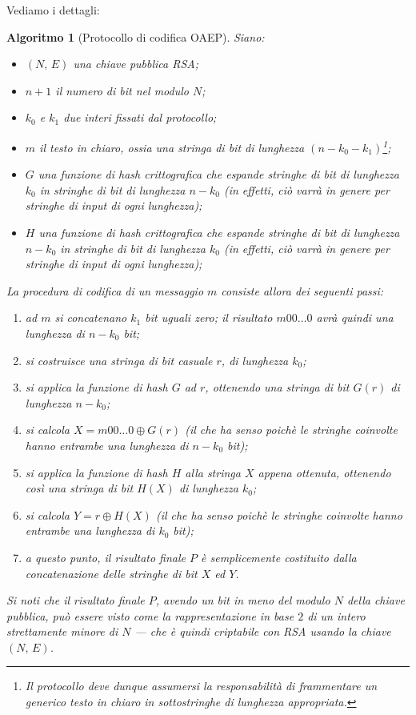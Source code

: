 \documentclass[pdflatex,11pt,a4paper,oneside]{article}
\let\OldEmph\emph
\renewcommand{\emph}[1]{\OldEmph{#1\/}}
\newcommand{\p}[1]{\left({#1}\right)}
\newtheorem{algorithm}[TheoremLike]{Algoritmo}
\begin{document}
\medskip\noindent
Vediamo i dettagli:
\begin{algorithm}[Protocollo di codifica OAEP]
%
Siano:
\begin{itemize}
 \item $(N,\,E)$ una chiave pubblica RSA;
 \item $n + 1$ il numero di bit nel modulo $N$;
 \item $k_0$ e $k_1$ due interi fissati dal protocollo;
 \item $m$ il testo in chiaro, ossia una stringa di bit di lunghezza
       $\p{n - k_0 - k_1}$\footnote{Il protocollo deve dunque assumersi
       la responsabilit\`a di frammentare un generico testo in chiaro in
       sottostringhe di lunghezza appropriata.};
 \item $G$ una funzione di hash crittografica che espande stringhe di bit
       di lunghezza $k_0$ in stringhe di bit di lunghezza $n - k_0$ (in
       effetti, ci\`o varr\`a in genere per stringhe di input di ogni
       lunghezza);
 \item $H$ una funzione di hash crittografica che espande stringhe di bit
       di lunghezza $n - k_0$ in stringhe di bit di lunghezza $k_0$ (in
       effetti, ci\`o varr\`a in genere per stringhe di input di ogni
       lunghezza);
\end{itemize}
%
La procedura di codifica di un messaggio $m$ consiste allora dei seguenti
passi:
\begin{enumerate}
\item
  ad $m$ si concatenano $k_1$ bit uguali zero; il risultato $m00\ldots0$
  avr\`a quindi una lunghezza di $n - k_0$ bit;
\item
  si costruisce una stringa di bit \emph{casuale} $r$, di lunghezza
  $k_0$;
\item
  si applica la funzione di hash $G$ ad $r$, ottenendo una stringa di
  bit $G(r)$ di lunghezza $n - k_0$;
\item
  si calcola $X = m00\ldots0 \oplus G(r)$ (il che ha senso poich\`e le
  stringhe coinvolte hanno entrambe una lunghezza di $n - k_0$ bit);
\item
  si applica la funzione di hash $H$ alla stringa $X$ appena ottenuta,
  ottenendo cos\`i una stringa di bit $H(X)$ di lunghezza $k_0$;
\item
  si calcola $Y = r \oplus H(X)$ (il che ha senso poich\`e le stringhe
  coinvolte hanno entrambe una lunghezza di $k_0$ bit);
\item
  a questo punto, il risultato finale $P$ \`e semplicemente costituito
  dalla concatenazione delle stringhe di bit $X$ ed $Y$.
\end{enumerate}
Si noti che il risultato finale $P$, avendo un bit in meno del modulo
$N$ della chiave pubblica, pu\`o essere visto come la rappresentazione
in base $2$ di un intero \emph{strettamente} minore di $N$ --- che \`e
quindi criptabile con RSA usando la chiave $(N,\,E)$.


\end{algorithm}
\end{document}
